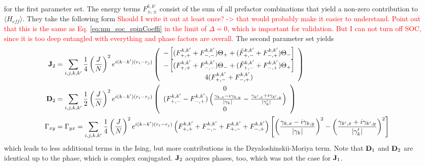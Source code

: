 for the first parameter set.
The energy terms $F^{k,k'}_{\pm, \pm}$ consist of the sum of all prefactor combinations that yield a non-zero contribution to $\langle H_{eff} \rangle$.
They take the following form \textcolor{red}{Should I write it out at least once? -> that would probably make it easier to understand. Point out that this is the same as Eq. \eqref{eq:nm_soc_spinCoeffi} in the limit of $\Delta = 0$, which is important for validation. But I can not turn off SOC, since it is too deep entangled with everything and phase factors are overall.}\newline
The second parameter set yields 
\begin{align}
     \vb{J}_2 &= \sum_{i,j,k,k'} \frac{1}{4}\left(\frac{J}{N}\right)^2 e^{i(k-k')(r_i-r_j)}\left( 
    \begin{array}{c}
        -\left[ (F^{k,k'}_{+,+} +  F^{k,k'}_{-,-}) \Theta_{+} + (\Tilde{F}^{k,k'}_{+,-} +  F^{k,k'}_{-,+}) \Theta_{-} \right] \\
         -\left[ (F^{k,k'}_{+,+} +  F^{k,k'}_{-,-}) \Theta_{-} + (\Tilde{F}^{k,k'}_{+,-} +  F^{k,k'}_{-,+}) \Theta_{+} \right] \\
         4 (F^{k,k'}_{+,-} +  F^{k,k'}_{-,+})
    \end{array}
    \right) \\ \nonumber
    \vb{D}_2 &= \sum_{i,j,k,k'} \frac{1}{2}\left(\frac{J}{N}\right)^2 e^{i(k-k')(r_i-r_j)} \left( 
    \begin{array}{c}
        0\\
         ( F^{k,k'}_{+,-} -  F^{k,k'}_{-,+})\left(\frac{\gamma_{k,x} - i \gamma_{k,y}}{|\gamma_k|} - \frac{\gamma_{k',x} + i \gamma_{k',y}}{|\gamma_k'|}\right)\\
         0
    \end{array}
    \right) \\ \nonumber
    {\Gamma}_{xy} &= {\Gamma}_{yx} = \sum_{i,j,k,k'} \frac{1}{4}\left(\frac{J}{N}\right)^2 e^{i(k-k')(r_i-r_j)} 
    \left(F^{k,k'}_{+,+} +  F^{k,k'}_{-,-} +  F^{k,k'}_{+,-} +  F^{k,k'}_{-,+}\right) \left[
    \left(\frac{\gamma_{k,x} - i \gamma_{k,y}}{|\gamma_k|}\right)^2 - \left( \frac{\gamma_{k',x} + i \gamma_{k',y}}{|\gamma_k'|}\right)^2 \right]
\end{align}
which leads to less additional terms in the Ising, but more contributions in the Dzyaloshinskii-Moriya term. \newline
Note that $\vb{D}_1$ and $\vb{D}_2$ are identical up to the phase, which is complex conjugated.
$\vb{J}_2$ acquires phases, too, which was not the case for $\vb{J}_1$.\newline

